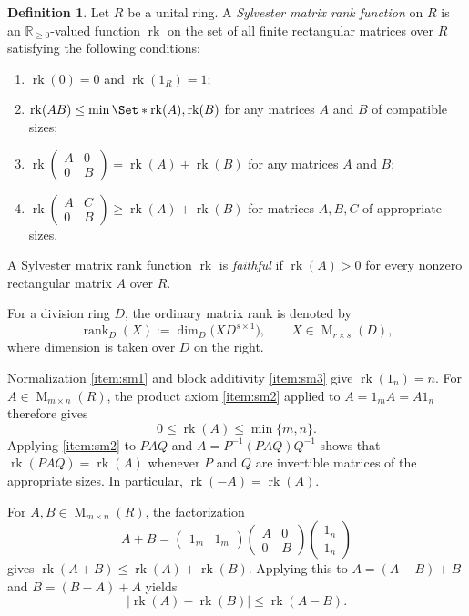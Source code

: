 \documentclass[11pt]{amsart}
\DeclareMathOperator{\rk}{rk}
\DeclareMathOperator{\Mat}{M}
\theoremstyle{definition}
\newtheorem{definition}[theorem]{Definition}
\theoremstyle{remark}
\begin{document}
\begin{definition}\label{def.MRank}
Let $R$ be a unital ring.
A \emph{Sylvester matrix rank function} on $R$ is an
$\mathbb R_{\geq0}$-valued function $\rk$ on the set of all finite rectangular
matrices over $R$ satisfying the following conditions:
\begin{enumerate}[label=(SM\arabic*)]
\item\label{item:sm1} $\rk(0)=0$ and $\rk(1_R)=1$;
\item\label{item:sm2} $\rk(AB)\leq\min\Set*{\rk(A),\rk(B)}$ for any matrices \(A\) and \(B\) of compatible sizes;
\item\label{item:sm3} \( \rk\begin{pmatrix}A&0\\0&B\end{pmatrix}
 =\rk(A)+\rk(B)\) for any matrices \(A\) and \(B\);
\item\label{item:sm4} \(\rk\begin{pmatrix}A&C\\0&B\end{pmatrix}
\geq\rk(A)+\rk(B)\) for matrices $A,B,C$ of appropriate sizes.
\end{enumerate}
\end{definition}

A Sylvester matrix rank function $\rk$ is \emph{faithful} if
$\rk(A)>0$ for every nonzero rectangular matrix $A$ over $R$.

For a division ring $D$, the ordinary matrix rank is denoted by
\[
 \operatorname{rank}_D(X):=\dim_D\bigl(XD^{s\times1}\bigr),
 \qquad X\in\Mat_{r\times s}(D),
\]
where dimension is taken over $D$ on the right.

Normalization \ref{item:sm1} and block additivity \ref{item:sm3} give
$\rk(1_n)=n$.
For $A\in\Mat_{m\times n}(R)$, the product axiom \ref{item:sm2} applied to $A=1_mA=A1_n$
therefore gives
\[
 0\leq\rk(A)\leq\min\{m,n\}.
\]
Applying \ref{item:sm2} to $PAQ$ and $A=P^{-1}(PAQ)Q^{-1}$ shows that
$\rk(PAQ)=\rk(A)$ whenever $P$ and $Q$ are invertible matrices of the
appropriate sizes.  In particular, $\rk(-A)=\rk(A)$.

For $A,B\in\Mat_{m\times n}(R)$, the factorization
\[
 A+B
 =\begin{pmatrix}1_m&1_m\end{pmatrix}
  \begin{pmatrix}A&0\\0&B\end{pmatrix}
  \begin{pmatrix}1_n\\1_n\end{pmatrix}
\]
gives $\rk(A+B)\leq\rk(A)+\rk(B)$.
Applying this to $A=(A-B)+B$ and $B=(B-A)+A$ yields
\[
 \lvert\rk(A)-\rk(B)\rvert\leq\rk(A-B).
\]
\end{document}
